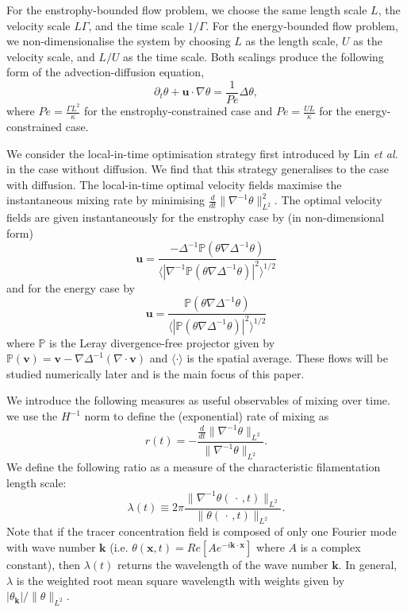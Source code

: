 \documentclass[12pt]{iopart}
\newcommand{\ddt}[1]{\frac{d #1}{dt}}
\newcommand{\hmone}[1]{\|\nabla^{-1} #1\|_{L^{2}}}
\newcommand{\ltwo}[1]{\|#1\|_{L^{2}}}
\renewcommand{\vec}[1]{\mathbf{#1}}
\newcommand{\ppt}[1]{\partial_{t} #1}
\newcommand{\lap}{\Delta }
\newcommand{\invlap}{\Delta^{-1}}
\begin{document}
For the enstrophy-bounded flow problem, we choose the same length scale $L$, the velocity scale $L\Gamma $, and  the time scale $1/\Gamma$. For the energy-bounded flow problem, we non-dimensionalise the system by choosing $L$ as the length scale, $U$ as the velocity scale, and $L/U$ as the time scale.  Both scalings produce the following form of the advection-diffusion equation,
\begin{equation}
\label{eq:nd_ade}
	\ppt{\theta}+\mathbf{u}\cdot \nabla \theta=\frac{1}{Pe} \lap\theta,
\end{equation}
where $Pe=  \frac{\Gamma L^2}{\kappa}$ for the enstrophy-constrained case and $Pe= \frac{UL}{\kappa}$ for the energy-constrained case.   

We consider the local-in-time optimisation strategy first introduced by Lin {\it et al.} \cite{JFM2011} in the case without diffusion. We find that this strategy generalises to the case with diffusion. The local-in-time optimal velocity fields maximise the instantaneous mixing rate by minimising $\ddt{}\hmone{\theta}^2$. The optimal velocity fields are given instantaneously for the enstrophy case by (in non-dimensional form)
%
\begin{equation}
\mathbf{u}= \frac{-\invlap\mathds{P}(\theta \nabla \invlap\theta)}{\langle |\nabla^{-1}\mathds{P}(\theta \nabla \invlap\theta)|^2\rangle^{1/2}}
\end{equation}
%
and for the energy case by 
% 
\begin{equation}
\mathbf{u}= \frac{\mathds{P}(\theta \nabla \invlap\theta)}{\langle |\mathds{P}(\theta \nabla \invlap\theta)|^2\rangle^{1/2}}
\end{equation} 
%
where $\mathds{P}$ is the Leray divergence-free projector given by $\mathds{P}(\vec{v}) = \vec{v} - \nabla \Delta^{-1}(\nabla \cdot \vec{v})$ and $\langle \cdot \rangle$ is the spatial average. These flows will be studied numerically later and is the main focus of this paper.


We introduce the following measures as useful observables of mixing over time. we use the $H^{-1}$ norm to define the (exponential) rate of mixing as
\begin{equation}
\label{eq:rate}
r(t) = -  \frac{\ddt{}\hmone{\theta}}{\hmone{\theta}}.
\end{equation}
We define the following ratio as a measure of the characteristic filamentation length scale:
\begin{equation}
\lambda(t)\equiv  2\pi \frac{\|\nabla^{-1}\theta(\,\cdot\,,t)\|_{L^{2}}}{\|\theta(\,\cdot\,,t)\|_{L^{2}}}.
\end{equation}
Note that if the tracer concentration field is composed of only one Fourier mode with wave number $\vec{k}$ (i.e. $\theta(\vec{x},t) = Re[ A e^{-i\vec{k}\cdot \vec{x}}]$ where $A$ is a complex constant), then $\lambda(t)$ returns the wavelength of the wave number $\vec{k}$. In general, $\lambda$ is the weighted root mean square wavelength with weights given by $|\theta_{\vec{k}}|/\ltwo{\theta}$. 
\end{document}
